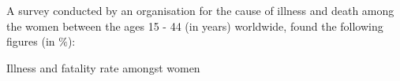  A survey conducted by an organisation for the cause of illness and death among the women between the ages 15 - 44 (in years) worldwide, found the following figures (in $\%$):\\
\begin{table}[ht!]
\centering

\caption{Illness and fatality rate amongst women}
\label{table:input_37}
\end{table}
